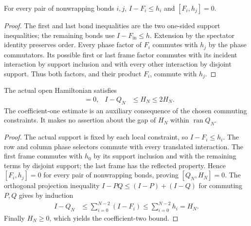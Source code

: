 \begin{theorem}
    \label{thm:mpo_joint_open_bond_control}
    For every pair of nonwrapping bonds $i,j$,
    $I-F_i\le h_i$ and $[F_i,h_j]=0$.
\end{theorem}
\begin{proof}
    The first and last bond inequalities are the two one-sided support
    inequalities; the remaining bonds use $I-F_{\mathrm{in}}\le h$.
    Extension by the spectator identity preserves order.
    Every phase factor of $F_i$ commutes with $h_j$ by the phase
    commutators. Its possible first or last frame factor commutes with
    its incident interaction by support inclusion and with every other
    interaction by disjoint support. Thus both factors, and their
    product $F_i$, commute with $h_j$.
\end{proof}

\begin{theorem}
    \label{thm:mpo_joint_open_inactive_penalty}
    The actual open Hamiltonian satisfies
    \begin{align}
        [Q_N,H_N] & =0, & I-Q_N & \le H_N\le2H_N.
        \label{eq:mpo_joint_open_inactive_penalty}
    \end{align}
    The coefficient-one estimate is an auxiliary consequence of the
    chosen commuting constraints. It makes no assertion about the gap
    of $H_N$ within $\operatorname{ran}Q_N$.
\end{theorem}
\begin{proof}
    The actual support is fixed by each local constraint, so
    $I-F_i\le h_i$. The row and column phase selectors commute with
    every translated interaction. The first frame commutes with $h_0$
    by its support inclusion and with the remaining terms by disjoint
    support; the last frame has the reflected property.
    Hence $[F_i,h_j]=0$ for every pair of nonwrapping bonds, proving
    $[Q_N,H_N]=0$. The orthogonal projection inequality
    $I-PQ\le(I-P)+(I-Q)$ for commuting $P,Q$ gives by induction
    \begin{align}
        I-Q_N & \le\sum_{i=0}^{N-2}(I-F_i)
        \le\sum_{i=0}^{N-2}h_i=H_N.
    \end{align}
    Finally $H_N\ge0$, which yields the coefficient-two bound.
\end{proof}

